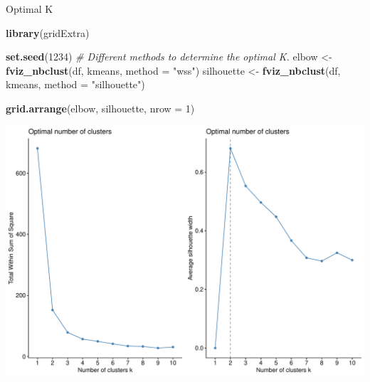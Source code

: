 \documentclass[12pt,ignorenonframetext,]{beamer}
\newenvironment{Shaded}{\begin{snugshade}}{\end{snugshade}}
\newcommand{\CommentTok}[1]{\textcolor[rgb]{0.56,0.35,0.01}{\textit{#1}}}
\newcommand{\DataTypeTok}[1]{\textcolor[rgb]{0.13,0.29,0.53}{#1}}
\newcommand{\DecValTok}[1]{\textcolor[rgb]{0.00,0.00,0.81}{#1}}
\newcommand{\KeywordTok}[1]{\textcolor[rgb]{0.13,0.29,0.53}{\textbf{#1}}}
\newcommand{\NormalTok}[1]{#1}
\newcommand{\StringTok}[1]{\textcolor[rgb]{0.31,0.60,0.02}{#1}}
\begin{document}
\begin{frame}[fragile]{Optimal K}
\protect\hypertarget{optimal-k}{}

\tiny

\begin{Shaded}
\begin{Highlighting}[]
\KeywordTok{library}\NormalTok{(gridExtra)}

\KeywordTok{set.seed}\NormalTok{(}\DecValTok{1234}\NormalTok{)}
\CommentTok{# Different methods to determine the optimal K.}
\NormalTok{elbow <-}\StringTok{ }\KeywordTok{fviz_nbclust}\NormalTok{(df, kmeans, }\DataTypeTok{method =} \StringTok{"wss"}\NormalTok{)}
\NormalTok{silhouette <-}\StringTok{ }\KeywordTok{fviz_nbclust}\NormalTok{(df, kmeans, }\DataTypeTok{method =} \StringTok{"silhouette"}\NormalTok{)}

\KeywordTok{grid.arrange}\NormalTok{(elbow, silhouette, }\DataTypeTok{nrow =} \DecValTok{1}\NormalTok{)}
\end{Highlighting}
\end{Shaded}

\begin{center}\includegraphics[width=0.7\linewidth,height=0.6\textheight]{figs/unnamed-chunk-16} \end{center}

\normalsize

\end{frame}
\end{document}
